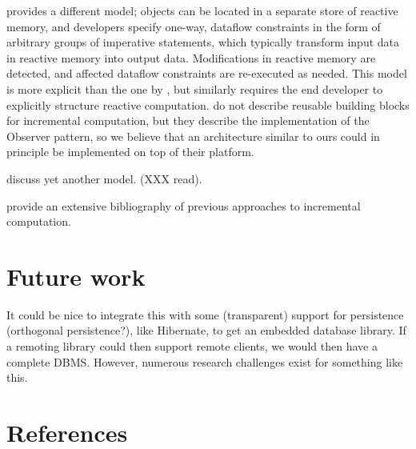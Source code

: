 \documentclass[preprint,authoryear,10pt]{sigplanconf}
\begin{document}
\citet{Demetrescu11} provides a different model; objects can be located
in a separate store of reactive memory, and developers specify one-way,
dataflow constraints in the form of arbitrary groups of imperative
statements, which typically transform input data in reactive memory into
output data. Modifications in reactive memory are detected, and affected
dataflow constraints are re-executed as needed. This model is more
explicit than the one by \citet{Hammer11}, but similarly requires the
end developer to explicitly structure reactive computation.
\citeauthor{Demetrescu11} do not describe reusable building blocks for
incremental computation, but they describe the implementation of the
Observer pattern, so we believe that an architecture similar to ours
could in principle be implemented on top of their platform.

\citet{Burckhardt11} discuss yet another model. (XXX read).

\citet{Ramalingam93} provide an extensive bibliography of previous
approaches to incremental computation.

\section{Future work}

It could be nice to integrate this with some (transparent) support for
persistence (orthogonal persistence?), like Hibernate, to get an
embedded database library. If a remoting library could then support
remote clients, we would then have a complete DBMS. However, numerous
research challenges exist for something like this.

\section{References}


\end{document}
